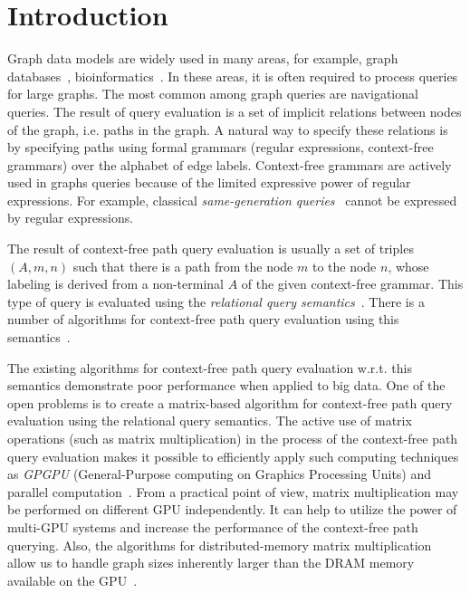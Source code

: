 \section{Introduction}
Graph data models are widely used in many areas, for example, graph databases~\cite{graphDB}, bioinformatics~\cite{Bio}. In these areas, it is often required to process queries for large graphs. The most common among graph queries are navigational queries. The result of query evaluation is a set of implicit relations between nodes of the graph, i.e. paths in the graph. A natural way to specify these relations is by specifying paths using formal grammars (regular expressions, context-free grammars) over the alphabet of edge labels. Context-free grammars are actively used in graphs queries because of the limited expressive power of regular expressions. For example, classical \textit{same-generation queries}~\cite{FndDB} cannot be expressed by regular expressions.

The result of context-free path query evaluation is usually a set of triples $(A, m, n)$ such that there is a path from the node $m$ to the node $n$, whose labeling is derived from a non-terminal $A$ of the given context-free grammar. This type of query is evaluated using the \textit{relational query semantics}~\cite{hellingsRelational}. There is a number of algorithms for context-free path query evaluation using this semantics~\cite{GLL, hellingsRelational, RDF, GraphQueryWithEarley}.

The existing algorithms for context-free path query evaluation w.r.t. this semantics demonstrate poor performance when applied to big data. One of the open problems is to create a matrix-based algorithm for context-free path query evaluation using the relational query semantics. The active use of matrix operations (such as matrix multiplication) in the process of the context-free path query evaluation makes it possible to efficiently apply such computing techniques as \textit{GPGPU} (General-Purpose computing on Graphics Processing Units) and parallel computation~\cite{matricesOnGPGPU}. From a practical point of view, matrix multiplication may be performed on different GPU independently. It can help to utilize the power of multi-GPU systems and increase the performance of the context-free path querying. Also, the algorithms for distributed-memory matrix
multiplication allow us to handle graph sizes inherently larger than the DRAM memory available on the GPU~\cite{MM_on_multi-GPU, hetero_multi-GPU, choi1994pumma}.

